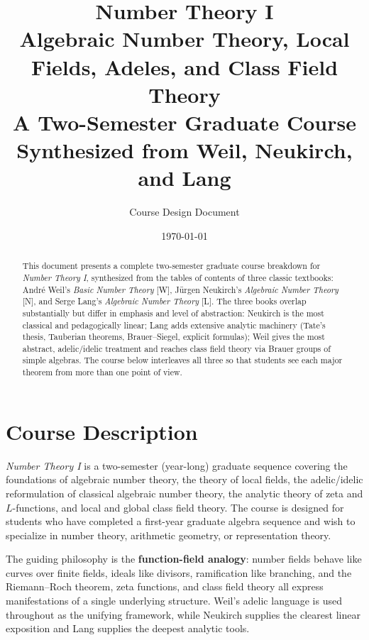 \documentclass[11pt]{article}
\title{\textbf{Number Theory I}\\[4pt]
\Large Algebraic Number Theory, Local Fields, Adeles, and Class Field Theory\\[2pt]
\large A Two-Semester Graduate Course Synthesized from Weil, Neukirch, and Lang}
\author{Course Design Document}
\date{\today}
\newcommand{\W}{[\textsc{W}]}
\newcommand{\N}{[\textsc{N}]}
\newcommand{\Lg}{[\textsc{L}]}
\begin{document}
\maketitle

\begin{abstract}
\noindent This document presents a complete two-semester graduate course breakdown for \emph{Number Theory I}, synthesized from the tables of contents of three classic textbooks: André Weil's \emph{Basic Number Theory} \W, Jürgen Neukirch's \emph{Algebraic Number Theory} \N, and Serge Lang's \emph{Algebraic Number Theory} \Lg. The three books overlap substantially but differ in emphasis and level of abstraction: Neukirch is the most classical and pedagogically linear; Lang adds extensive analytic machinery (Tate's thesis, Tauberian theorems, Brauer--Siegel, explicit formulas); Weil gives the most abstract, adelic/idelic treatment and reaches class field theory via Brauer groups of simple algebras. The course below interleaves all three so that students see each major theorem from more than one point of view.
\end{abstract}

\tableofcontents

\section{Course Description}
\emph{Number Theory I} is a two-semester (year-long) graduate sequence covering the foundations of algebraic number theory, the theory of local fields, the adelic/idelic reformulation of classical algebraic number theory, the analytic theory of zeta and $L$-functions, and local and global class field theory. The course is designed for students who have completed a first-year graduate algebra sequence and wish to specialize in number theory, arithmetic geometry, or representation theory.

The guiding philosophy is the \textbf{function-field analogy}: number fields behave like curves over finite fields, ideals like divisors, ramification like branching, and the Riemann--Roch theorem, zeta functions, and class field theory all express manifestations of a single underlying structure. Weil's adelic language is used throughout as the unifying framework, while Neukirch supplies the clearest linear exposition and Lang supplies the deepest analytic tools.
\end{document}
